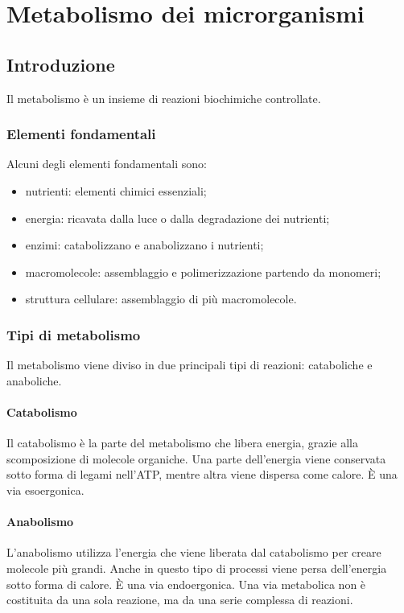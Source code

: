 \chapter{Metabolismo dei microrganismi}

\section{Introduzione}
Il metabolismo \`e un insieme di reazioni biochimiche controllate. 

	\subsection{Elementi fondamentali}
	Alcuni degli elementi fondamentali sono:
	\begin{multicols}{2}
		\begin{itemize}
		    \item nutrienti: elementi chimici essenziali; 
		    \item energia: ricavata dalla luce o dalla degradazione dei nutrienti;
		    \item enzimi: catabolizzano e anabolizzano i nutrienti;
		    \item macromolecole: assemblaggio e polimerizzazione partendo da monomeri; 
		    \item struttura cellulare: assemblaggio di pi\`u macromolecole. 
		\end{itemize}
	\end{multicols}

	\subsection{Tipi di metabolismo}
	Il metabolismo viene diviso in due principali tipi di reazioni: cataboliche e anaboliche. 

		\subsubsection{Catabolismo}
		Il catabolismo \`e la parte del metabolismo che libera energia, grazie alla scomposizione di molecole organiche. 
		Una parte dell'energia viene conservata sotto forma di legami nell'ATP, mentre altra viene dispersa come calore. 
		\`E una via esoergonica.

		\subsubsection{Anabolismo}
		L'anabolismo utilizza l'energia che viene liberata dal catabolismo per creare molecole pi\`u grandi. 
		Anche in questo tipo di processi viene persa dell'energia sotto forma di calore. 
		\`E una via endoergonica.
		Una via metabolica non \`e costituita da una sola reazione, ma da una serie complessa di reazioni. 

